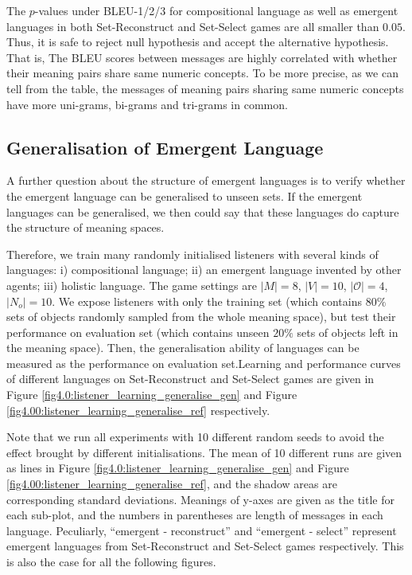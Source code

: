 The $p$-values under BLEU-1/2/3 for compositional language as well as emergent languages in both Set-Reconstruct and Set-Select games are all smaller than $0.05$. Thus, it is safe to reject null hypothesis and accept the alternative hypothesis. That is, The BLEU scores between messages are highly correlated with whether their meaning pairs share same numeric concepts. To be more precise, as we can tell from the table, the messages of meaning pairs sharing same numeric concepts have more uni-grams, bi-grams  and tri-grams in common.

\subsection{Generalisation of Emergent Language}
\label{ssec4.2.4:emergent_lan_generalise}

A further question about the structure of emergent languages is to verify whether the emergent language can be generalised to unseen sets. If the emergent languages can be generalised, we then could say that these languages do capture the structure of meaning spaces.

Therefore, we train many randomly initialised listeners with several kinds of languages: i) compositional language; ii) an emergent language invented by other agents; iii) holistic language. The game settings are $|M|=8$, $|V|=10$, $|\mathcal{O}|=4$, $|N_{o}|=10$. We expose listeners with only the training set (which contains $80\%$ sets of objects randomly sampled from the whole meaning space), but test their performance on evaluation set (which contains unseen $20\%$ sets of objects left in the meaning space). Then, the generalisation ability of languages can be measured as the performance on evaluation set.Learning and performance curves of different languages on Set-Reconstruct and Set-Select games are given in Figure \ref{fig4.0:listener_learning_generalise_gen} and Figure \ref{fig4.00:listener_learning_generalise_ref} respectively. 

Note that we run all experiments with 10 different random seeds to avoid the effect brought by different initialisations. The mean of 10 different runs are given as lines in Figure \ref{fig4.0:listener_learning_generalise_gen} and Figure \ref{fig4.00:listener_learning_generalise_ref}, and the shadow areas are corresponding standard deviations. Meanings of y-axes are given as the title for each sub-plot, and the numbers in parentheses are length of messages in each language. Peculiarly, ``emergent - reconstruct'' and ``emergent - select'' represent emergent languages from Set-Reconstruct and Set-Select games respectively. This is also the case for all the following figures.

